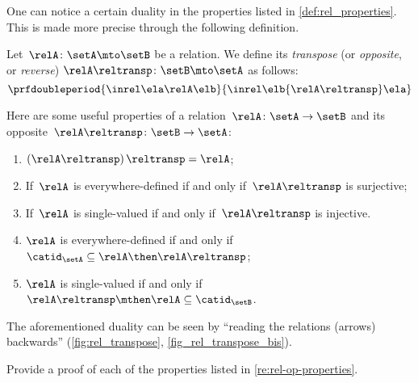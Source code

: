 One can notice a certain duality in the properties listed in \cref{def:rel_properties}.
This is made more precise through the following definition.

\begin{ctdefinition}
	\label{def:relation-transpose}
	Let~$\relA\colon \setA\mto \setB$ be a relation.
	We define its \emph{transpose} (or \emph{opposite}, or \emph{reverse}) $\relA\reltransp\colon \setB \mto \setA$ as follows:
	\begin{equation*}
		\prfdoubleperiod{
			\inrel \ela \relA \elb
		}{
			\inrel \elb {\relA\reltransp} \ela
		}
	\end{equation*}
\end{ctdefinition}
\begin{remark}
	\label{re:rel-op-properties}
	Here are some useful properties of a relation~$\relA\colon \setA\to \setB$  and its opposite~$\relA\reltransp\colon \setB\to \setA$:
	\begin{enumerate}
		\item $\left(\relA\reltransp\right)\reltransp = \relA $;
		\item If~$\relA$ is everywhere-defined if and only if~$\relA\reltransp$ is surjective;
		\item If~$\relA$ is single-valued if and only if~$\relA\reltransp$ is injective.
		\item $\relA$ is everywhere-defined if and only if~$\catid_\setA\subseteq \relA \then \relA\reltransp$;
		\item $\relA$ is single-valued if and only if~$\relA\reltransp\mthen \relA\subseteq \catid_\setB$.
	\end{enumerate}
\end{remark}

\begin{remark}
	The aforementioned duality can be seen by ``reading the relations (arrows) backwards'' (\cref{fig:rel_transpose}, \cref{fig_rel_transpose_bis}).
\end{remark}

\begin{marginfigure}
	\centering
	\caption{}
	\label{fig:rel_transpose}
\end{marginfigure}

\begin{marginfigure}
	\centering
	\caption{}
	\label{fig:rel_transpose_bis}
\end{marginfigure}

\vfill
\begin{gradedexercise}
	\label{ex:RelProperties}
	Provide a proof of each of the properties listed in \cref{re:rel-op-properties}.
\end{gradedexercise}

